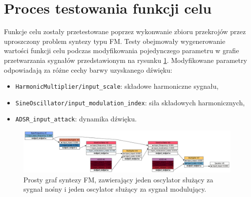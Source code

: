 \section{Proces testowania funkcji celu}

Funkcje celu zostały przetestowane poprzez wykonwanie
zbioru przekrojów przez uproszczony problem syntezy typu FM.
Testy obejmowały wygenerowanie wartości funkcji celu podczas
modyfikowania pojedynczego parametru w grafie przetwarzania sygnałów
przedstawionym na rysunku \ref{fig:fm_graph_for_benchmarks}.
Modyfikowane parametry odpowiadają za różne cechy barwy uzyskanego dźwięku:

\begin{itemize}
  \item \texttt{HarmonicMultiplier/input\_scale}:  składowe harmoniczne sygnału,
  \item \texttt{SineOscillator/input\_modulation\_index}: siła składowych harmonicznych,
  \item \texttt{ADSR\_input\_attack}: dynamika dźwięku.
\end{itemize}

\begin{figure}[H]
    \centering
    \includegraphics[width=1.0\linewidth]{rys03/fm_graph_for_benchmarks.png}
    \caption{
      Prosty graf syntezy FM, zawierający jeden oscylator służący za sygnał nośny
      i jeden oscylator służący za sygnał modulujący.
    }
    \label{fig:fm_graph_for_benchmarks}
\end{figure}
